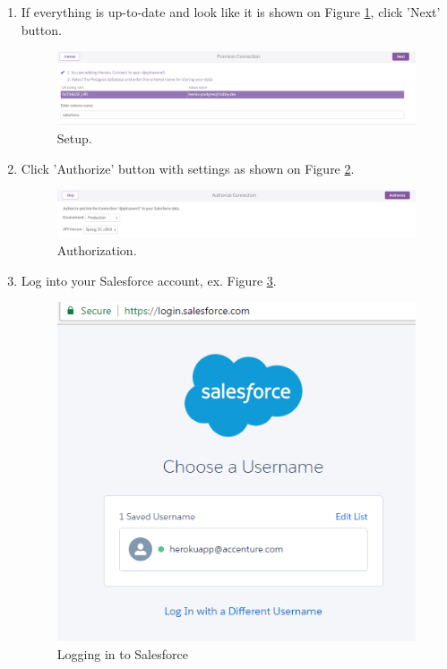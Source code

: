 \documentclass[12pt,a4paper]{article}
\begin{document}
\begin{enumerate}
\item If everything is up-to-date and look like it is shown on Figure \ref{fig:conc}, click 'Next' button.

\begin{figure}[H]
	\centering
	\includegraphics[width=1\textwidth]{images/connect3.PNG}
	\caption{Setup.}
	\label{fig:conc}
\end{figure}

\item Click 'Authorize' button with settings as shown on Figure \ref{fig:cond}.

\begin{figure}[H]
	\centering
	\includegraphics[width=1\textwidth]{images/connect4.PNG}
	\caption{Authorization.}
	\label{fig:cond}
\end{figure}

\item Log into your Salesforce account, ex. Figure \ref{fig:cone}.

\begin{figure}[H]
	\centering
	\includegraphics{images/connect5.PNG}
	\caption{Logging in to Salesforce}
	\label{fig:cone}
\end{figure}


\end{enumerate}
\end{document}
